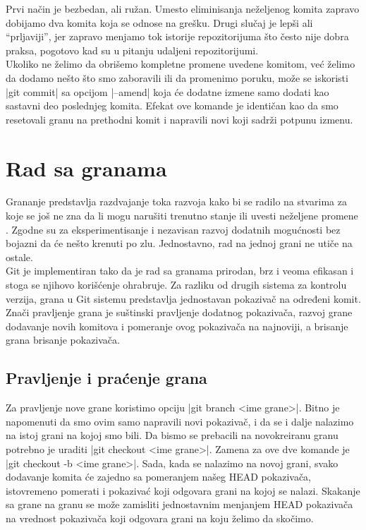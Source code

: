 \documentclass[a4paper]{article}
\begin{document}
{Prvi način je bezbedan, ali ružan. Umesto eliminisanja neželjenog komita zapravo dobijamo dva komita koja se odnose na grešku. Drugi slučaj je lepši ali ``prljaviji'', jer zapravo menjamo tok istorije repozitorijuma što često nije dobra praksa, pogotovo kad su u pitanju udaljeni repozitorijumi. \\

Ukoliko ne želimo da obrišemo kompletne promene uvedene komitom, već želimo da dodamo nešto što smo zaboravili ili da promenimo poruku, može se iskoristi |git commit| sa opcijom |--amend| koja će dodatne izmene samo dodati kao sastavni deo poslednjeg komita. Efekat ove komande je identičan kao da smo resetovali granu na prethodni komit i napravili novi koji sadrži potpunu izmenu.


\section{Rad sa granama}
\label{sec:grane}
Grananje predstavlja razdvajanje toka razvoja kako bi se radilo na stvarima za koje se još ne zna da li mogu narušiti trenutno stanje ili uvesti neželjene promene \cite{pocketguide}. Zgodne su za eksperimentisanje i nezavisan razvoj dodatnih mogućnosti bez bojazni da će nešto krenuti po zlu. Jednostavno, rad na jednoj grani ne utiče na ostale.\\

Git je implementiran tako da je rad sa granama prirodan, brz i veoma efikasan i stoga se njihovo korišćenje ohrabruje. Za razliku od drugih sistema za kontrolu verzija, grana u Git sistemu predstavlja jednostavan pokazivač na određeni komit. Znači pravljenje grana je suštinski pravljenje dodatnog pokazivača, razvoj grane dodavanje novih komitova i pomeranje ovog pokazivača na najnoviji, a brisanje grana brisanje pokazivača.

\subsection{Pravljenje i praćenje grana}
\label{subsec:pravljenje_grana}
Za pravljenje nove grane koristimo opciju |git branch <ime grane>|. Bitno je napomenuti da smo ovim samo napravili novi pokazivač, i da se i dalje nalazimo na istoj grani na kojoj smo bili. Da bismo se prebacili na novokreiranu granu potrebno je uraditi |git checkout <ime grane>|. Zamena za ove dve komande je |git checkout -b <ime grane>|. 
Sada, kada se nalazimo na novoj grani, svako dodavanje komita će zajedno sa pomeranjem našeg HEAD pokazivača, istovremeno pomerati i pokazivać koji odgovara grani na kojoj se nalazi. Skakanje sa grane na granu se može zamisliti jednostavnim menjanjem HEAD pokazivača na vrednost pokazivača koji odgovara grani na koju želimo da skočimo.\\

}
\end{document}
